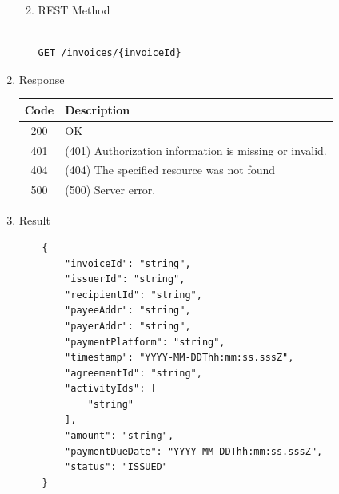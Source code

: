 \begin{enumerate}
\begin{enumerate}
\begin{table}[H]
\begin{center}
\begin{tabular}{|p{3cm}|l|p{3cm}|p{3cm}|p{4cm}|}
\end{tabular}
\end{center}
\end{table}


\item REST Method

\begin{tcolorbox}[boxrule=0pt, frame empty]
\begin{verbatim} 

GET /invoices/{invoiceId}

\end{verbatim}
\end{tcolorbox}

\end{enumerate}

\item Response

\begin{table}[H]
\footnotesize

\begin{center}
\begin{tabular}{|c|l|} 
\hline
\rowcolor{lightgray}	Code 		& 	Description \\
\hline
200	 		&	OK \\
\hline
401			&	(401) Authorization information is missing or invalid. \\
\hline
404			&	(404) The specified resource was not found \\
\hline
500			&	(500) Server error. \\
\hline
\end{tabular}
\end{center}

\end{table}

\item Result

\begin{tcolorbox}[boxrule=0pt, frame empty]
\begin{verbatim}
	{
		"invoiceId": "string",
		"issuerId": "string",
		"recipientId": "string",
		"payeeAddr": "string",
		"payerAddr": "string",
		"paymentPlatform": "string",
		"timestamp": "YYYY-MM-DDThh:mm:ss.sssZ",
		"agreementId": "string",
		"activityIds": [
			"string"
		],
		"amount": "string",
		"paymentDueDate": "YYYY-MM-DDThh:mm:ss.sssZ",
		"status": "ISSUED"
	}
\end{verbatim}
\end{tcolorbox}

\begin{table}[H]
\footnotesize


\end{table}
\end{enumerate}
